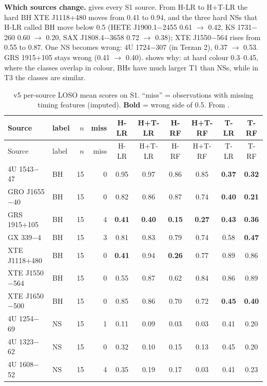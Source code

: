 \textbf{Which sources change.}  gives every S1 source. From H-LR to H+T-LR the hard BH
XTE J1118+480 moves from 0.41 to 0.94, and the three hard NSs that H-LR called BH move below 0.5 (HETE J1900.1$-$2455
0.61 $\to$ 0.42, KS 1731$-$260 0.60 $\to$ 0.20, SAX J1808.4$-$3658 0.72 $\to$ 0.38); XTE J1550$-$564 rises from 0.55 to 0.87.
One NS becomes wrong: 4U 1724$-$307 (in Terzan 2), 0.37 $\to$ 0.53. GRS 1915+105 stays wrong (0.41 $\to$ 0.40).
 shows why: at hard colour 0.3--0.45, where the classes overlap in colour, BHs have much larger
T1 than NSs, while in T3 the classes are similar.

{\footnotesize\setlength{\tabcolsep}{3.5pt}
\begin{longtable}{@{}llrr*{6}{c}@{}}
\caption[v5 per-source scores]{v5 per-source LOSO mean scores on S1. ``miss'' = observations with missing timing
features (imputed). \textbf{Bold} = wrong side of 0.5. From .}\label{tab:p3v5persource}\\
\toprule
Source & label & $n$ & miss & H-LR & H+T-LR & H-RF & H+T-RF & T-LR & T-RF \\
\midrule\endfirsthead
\toprule Source & label & $n$ & miss & H-LR & H+T-LR & H-RF & H+T-RF & T-LR & T-RF \\ \midrule\endhead
\bottomrule\endfoot
4U 1543$-$47 & BH & 15 & 0 & 0.95 & 0.97 & 0.86 & 0.85 & \textbf{0.37} & \textbf{0.32} \\
GRO J1655$-$40 & BH & 15 & 0 & 0.82 & 0.86 & 0.87 & 0.74 & \textbf{0.40} & \textbf{0.21} \\
GRS 1915+105 & BH & 15 & 4 & \textbf{0.41} & \textbf{0.40} & \textbf{0.15} & \textbf{0.27} & \textbf{0.43} & \textbf{0.36} \\
GX 339$-$4 & BH & 15 & 3 & 0.81 & 0.83 & 0.79 & 0.74 & 0.58 & \textbf{0.47} \\
XTE J1118+480 & BH & 15 & 0 & \textbf{0.41} & 0.94 & \textbf{0.26} & 0.77 & 0.89 & 0.86 \\
XTE J1550$-$564 & BH & 15 & 0 & 0.55 & 0.87 & 0.62 & 0.84 & 0.86 & 0.89 \\
XTE J1650$-$500 & BH & 15 & 0 & 0.85 & 0.86 & 0.70 & 0.72 & \textbf{0.45} & \textbf{0.40} \\
4U 1254$-$69 & NS & 15 & 1 & 0.11 & 0.09 & 0.03 & 0.03 & 0.41 & 0.20 \\
4U 1323$-$62 & NS & 15 & 0 & 0.32 & 0.10 & 0.15 & 0.13 & 0.45 & 0.20 \\
4U 1608$-$52 & NS & 15 & 4 & 0.35 & 0.19 & 0.17 & 0.03 & 0.41 & 0.23 \\

\end{longtable}}
